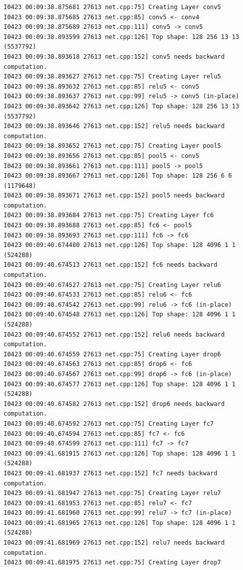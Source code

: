 \documentclass[a4]{article}
\begin{document}
\begin{lstlisting}
I0423 00:09:38.875681 27613 net.cpp:75] Creating Layer conv5
I0423 00:09:38.875685 27613 net.cpp:85] conv5 <- conv4
I0423 00:09:38.875689 27613 net.cpp:111] conv5 -> conv5
I0423 00:09:38.893599 27613 net.cpp:126] Top shape: 128 256 13 13 (5537792)
I0423 00:09:38.893618 27613 net.cpp:152] conv5 needs backward computation.
I0423 00:09:38.893627 27613 net.cpp:75] Creating Layer relu5
I0423 00:09:38.893632 27613 net.cpp:85] relu5 <- conv5
I0423 00:09:38.893637 27613 net.cpp:99] relu5 -> conv5 (in-place)
I0423 00:09:38.893642 27613 net.cpp:126] Top shape: 128 256 13 13 (5537792)
I0423 00:09:38.893646 27613 net.cpp:152] relu5 needs backward computation.
I0423 00:09:38.893652 27613 net.cpp:75] Creating Layer pool5
I0423 00:09:38.893656 27613 net.cpp:85] pool5 <- conv5
I0423 00:09:38.893661 27613 net.cpp:111] pool5 -> pool5
I0423 00:09:38.893667 27613 net.cpp:126] Top shape: 128 256 6 6 (1179648)
I0423 00:09:38.893671 27613 net.cpp:152] pool5 needs backward computation.
I0423 00:09:38.893684 27613 net.cpp:75] Creating Layer fc6
I0423 00:09:38.893688 27613 net.cpp:85] fc6 <- pool5
I0423 00:09:38.893693 27613 net.cpp:111] fc6 -> fc6
I0423 00:09:40.674480 27613 net.cpp:126] Top shape: 128 4096 1 1 (524288)
I0423 00:09:40.674513 27613 net.cpp:152] fc6 needs backward computation.
I0423 00:09:40.674527 27613 net.cpp:75] Creating Layer relu6
I0423 00:09:40.674533 27613 net.cpp:85] relu6 <- fc6
I0423 00:09:40.674542 27613 net.cpp:99] relu6 -> fc6 (in-place)
I0423 00:09:40.674548 27613 net.cpp:126] Top shape: 128 4096 1 1 (524288)
I0423 00:09:40.674552 27613 net.cpp:152] relu6 needs backward computation.
I0423 00:09:40.674559 27613 net.cpp:75] Creating Layer drop6
I0423 00:09:40.674563 27613 net.cpp:85] drop6 <- fc6
I0423 00:09:40.674567 27613 net.cpp:99] drop6 -> fc6 (in-place)
I0423 00:09:40.674577 27613 net.cpp:126] Top shape: 128 4096 1 1 (524288)
I0423 00:09:40.674582 27613 net.cpp:152] drop6 needs backward computation.
I0423 00:09:40.674592 27613 net.cpp:75] Creating Layer fc7
I0423 00:09:40.674594 27613 net.cpp:85] fc7 <- fc6
I0423 00:09:40.674599 27613 net.cpp:111] fc7 -> fc7
I0423 00:09:41.681915 27613 net.cpp:126] Top shape: 128 4096 1 1 (524288)
I0423 00:09:41.681937 27613 net.cpp:152] fc7 needs backward computation.
I0423 00:09:41.681947 27613 net.cpp:75] Creating Layer relu7
I0423 00:09:41.681953 27613 net.cpp:85] relu7 <- fc7
I0423 00:09:41.681960 27613 net.cpp:99] relu7 -> fc7 (in-place)
I0423 00:09:41.681965 27613 net.cpp:126] Top shape: 128 4096 1 1 (524288)
I0423 00:09:41.681969 27613 net.cpp:152] relu7 needs backward computation.
I0423 00:09:41.681975 27613 net.cpp:75] Creating Layer drop7

\end{lstlisting}
\end{document}
